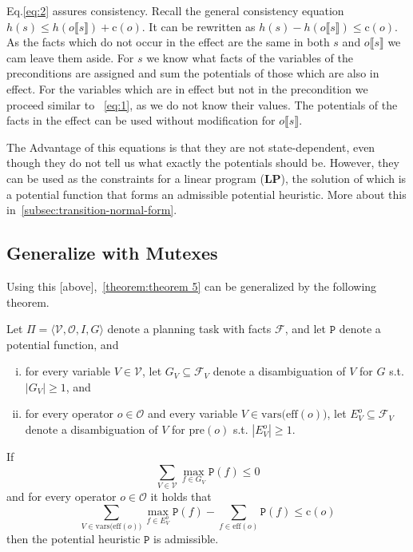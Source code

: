 Eq.\eqref{eq:2} assures consistency.
Recall the general consistency equation $h(s)\leq h(o\llbracket s\rrbracket)+\text{c}(o)$.
It can be rewritten as $h(s)-h(o\llbracket s\rrbracket)\leq\text{c}(o)$.
As the facts which do not occur in the effect are the same in both $s$ and $o\llbracket s\rrbracket$ we cam leave them aside. %
For $s$ we know what facts of the variables of the preconditions are assigned and sum the potentials of those which are also in effect.
For the variables which are in effect but not in the precondition we proceed similar to ~\eqref{eq:1}, as we do not know their values.
The potentials of the facts in the effect can be used without modification for  $o\llbracket s\rrbracket$.

The Advantage of this equations is that they are not state-dependent, even though they do not tell us what exactly the potentials should be.
However, they can be used as the constraints for a linear program (\textbf{LP}), the solution of which is a potential function that forms an admissible potential heuristic.
More about this in~\ref{subsec:transition-normal-form}.

\subsection{Generalize with Mutexes}\label{subsec:generalize-with-mutexes}

Using this [above],~\ref{theorem:theorem 5} can be generalized by the following theorem.

\begin{theorem}
    \label{theorem:7}
    Let $\Pi = \langle \mathcal{V}, \mathcal{O}, I, G \rangle$ denote a planning task with facts $\mathcal{F}$, and let $\mathtt{P}$ denote a potential function, and
    \begin{enumerate}[(i)]
        \item for every variable $V\in\mathcal{V}$, let $G_V\subseteq\mathcal{F}_V$ denote a disambiguation of $V$ for $G$ s.t. $|G_V|\geq1$, and
        \item for every operator $o\in\mathcal{O}$ and every variable $V\in\mathrm{vars(eff}(o))$, let $E^o_V\subseteq\mathcal{F}_V $ denote a disambiguation of $V$ for $\mathrm{pre}(o)$ s.t. $|E^o_V|\geq1$.
    \end{enumerate}

    If
    \[\sum_{V\in\mathcal{V}}\max_{f\in G_V}\mathtt{P}(f)\leq0\label{eq:3}\]
    and for every operator $o\in\mathcal{O}$ it holds that
    \[\sum_{V\in\mathrm{vars(eff}(o))}\max_{f\in E^o_V}\mathtt{P}(f) - \sum_{f\in\mathrm{eff}(o)}\mathtt{P}(f)\leq\mathrm{c}(o)\label{eq:4}\]
    then the potential heuristic $\mathtt{P}$ is admissible.
\end{theorem}

